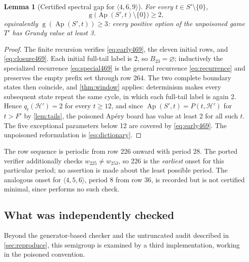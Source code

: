 \documentclass[11pt,letterpaper]{article}
\numberwithin{equation}{section}
\newtheorem{lemma}[theorem]{Lemma}
\theoremstyle{definition}
\theoremstyle{remark}
\newcommand{\sg}{\operatorname{g}}
\newcommand{\Ap}{\operatorname{Ap}}
\newcommand{\HH}{\mathcal H}
\begin{document}
\begin{lemma}[Certified spectral gap for $\langle4,6,9\rangle$]
\label{lem:gap469}
For every $t\in S'\setminus\{0\}$,
\begin{equation}\label{eq:gap469}
 \sg\bigl(\Ap(S',t)\setminus\{0\}\bigr)\geq2,
\end{equation}
equivalently $\sg(\Ap(S',t))\geq3$: every positive option of the
unpoisoned game $T'$ has Grundy value at least 3.
\end{lemma}
\begin{proof}
The finite recursion verifies \cref{eq:early469}, the eleven initial
rows, and \cref{eq:closure469}. Each initial full-tail label is 2, so
$B_{23}=\varnothing$; inductively the specialized recurrence
\cref{eq:special469} is the general recurrence \cref{eq:recurrence} and
preserves the empty prefix set through row 264. The two complete boundary
states then coincide, and \cref{thm:window} applies: determinism makes
every subsequent state repeat the same cycle, in which each full-tail
label is again 2. Hence $q_t(\HH')=2$ for every $t\geq12$, and since
$\Ap(S',t)=P(t,\HH')$ for $t>F'$ by \cref{lem:tails}, the poisoned
Ap\'ery board has value at least 2 for all such $t$. The five exceptional
parameters below 12 are covered by \cref{eq:early469}. The unpoisoned
reformulation is \cref{eq:dictionary}.
\end{proof}

The row sequence is periodic from row 226 onward with period 28. The
ported verifier additionally checks $w_{225}\neq w_{253}$, so 226 is the
\emph{earliest} onset for this particular period; no assertion is made
about the least possible period. The analogous onset for
$\langle4,5,6\rangle$, period 8 from row 36, is recorded but is not
certified minimal, since  performs no such check.

\subsection{What was independently checked}
\label{sec:checks469}

Beyond the generator-based checker and the untruncated audit described in
\cref{sec:reproduce}, this semigroup is examined by a third
implementation, working in the poisoned convention.
\end{document}
